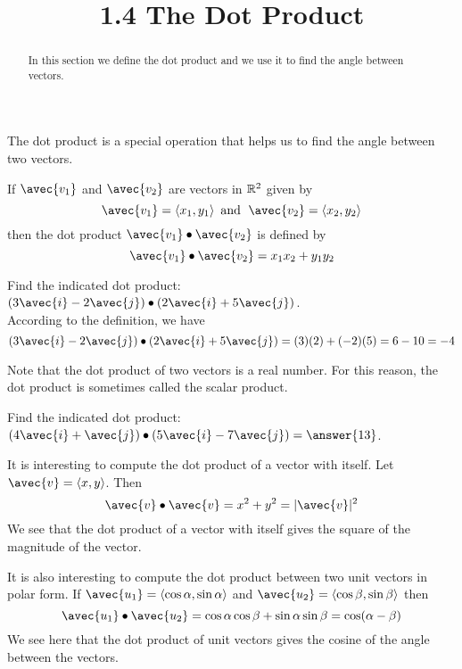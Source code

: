 \documentclass[handout]{ximera}
\title{1.4 The Dot Product}
\begin{document}
\begin{abstract}
In this section we define the dot product and we use it to find the angle between vectors.
\end{abstract}
 
\maketitle
The dot product is a special operation that helps us to find the angle between two vectors.
\begin{definition}
If $\avec{v_1}$ and $\avec{v_2}$ are vectors in $\mathbb R^2$ given by
\[
\avec{v_1} = \vector{x_1, y_1} \text{  and   } \;\avec{v_2} = \vector{x_2, y_2}
\]
then the dot product $\avec{v_1} \dotp \avec{v_2}$ is defined by
\[
\avec{v_1} \dotp \avec{v_2} = x_1x_2 + y_1y_2
\]
\end{definition}

\begin{example}
Find the indicated dot product: $\left(3\avec{i} -2\avec{j}\right) \dotp \left(2\avec{i} +5\avec{j}\right)$.\\
According to the definition, we have
\[
\left(3\avec{i} -2\avec{j}\right) \dotp \left(2\avec{i} +5\avec{j}\right) = (3)(2)+(-2)(5) = 6-10 = -4
\]
\end{example}

Note that the dot product of two vectors is a real number.  For this reason, the dot product is sometimes called the scalar product.

\begin{problem}
Find the indicated dot product: $\left(4\avec{i} + \avec{j}\right) \dotp \left(5\avec{i} -7\avec{j}\right) =\answer{13}$.\\
\end{problem}

It is interesting to compute the dot product of a vector with itself.  Let $\avec{v} = \vector{x, y}$. Then
\[
\avec{v} \dotp \avec{v} = x^2 + y^2 = |\avec{v}|^2
\]
We see that the dot product of a vector with itself gives the square of the magnitude of the vector.

It is also interesting to compute the dot product between two unit vectors in polar form.
If $\avec{u_1} = \vector{\cos \alpha, \sin \alpha}$ and $\avec{u_2} = \vector{\cos \beta, \sin \beta}$ then
\[
\avec{u_1} \dotp \avec{u_2} = \cos \alpha \cos \beta + \sin \alpha \sin \beta = \cos(\alpha - \beta)
\]
We see here that the dot product of unit vectors gives the cosine of the angle between the vectors.
\end{document}
